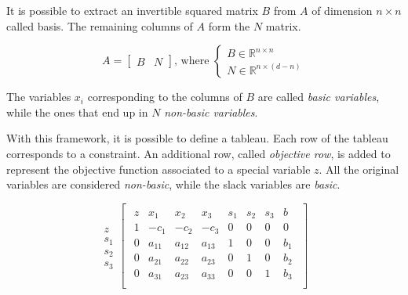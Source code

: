 It is possible to extract an invertible squared matrix $B$ from $A$ of dimension $n \times n$ called basis.
The remaining columns of $A$ form the $N$ matrix.

\begin{equation}
    A = \begin{bmatrix}
        B & N
    \end{bmatrix}
    \text{, where }
    \begin{cases}
        B \in \mathbb{R}^{n \times n} \\
        N \in \mathbb{R}^{n \times (d - n)}
    \end{cases}
\end{equation}

The variables $x_i$ corresponding to the columns of $B$ are called \textit{basic variables}, while the ones that end up in $N$ \textit{non-basic variables}.

With this framework, it is possible to define a tableau.
Each row of the tableau corresponds to a constraint.
An additional row, called \textit{objective row}, is added to represent the objective function associated to a special variable $z$.
All the original variables are considered \textit{non-basic}, while the slack variables are \textit{basic}.

\begin{equation}
    \begin{array}{c}
        \\
        z   \\
        s_1 \\
        s_2 \\
        s_3
    \end{array}
    \begin{bmatrix}
        \begin{array}{c|cccccc|c}
            z & x_1    & x_2    & x_3    & s_1 & s_2 & s_3 & b   \\ \hline
            1 & -c_1   & -c_2   & -c_3   & 0   & 0   & 0   & 0   \\ \hline
            0 & a_{11} & a_{12} & a_{13} & 1   & 0   & 0   & b_1 \\
            0 & a_{21} & a_{22} & a_{23} & 0   & 1   & 0   & b_2 \\
            0 & a_{31} & a_{23} & a_{33} & 0   & 0   & 1   & b_3 \\
        \end{array}
    \end{bmatrix}
\end{equation}

